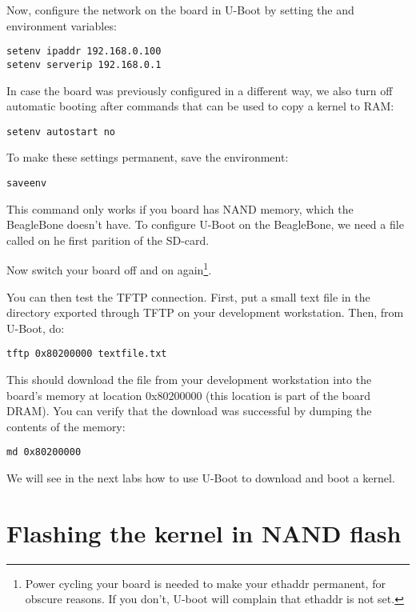 Now, configure the network on the board in U-Boot by setting the 
and  environment variables:

\begin{verbatim}
setenv ipaddr 192.168.0.100
setenv serverip 192.168.0.1
\end{verbatim}

In case the board was previously configured in a different way, we
also turn off automatic booting after commands that can be used to
copy a kernel to RAM:

\begin{verbatim}
setenv autostart no
\end{verbatim}

To make these settings permanent, save the environment:

\begin{verbatim}
saveenv
\end{verbatim}

This command only works if you board has NAND memory, which the BeagleBone doesn't have.
To configure U-Boot on the BeagleBone, we need a file called  on he first parition of the SD-card.

Now switch your board off and on again\footnote{Power cycling your
  board is needed to make your ethaddr permanent, for obscure
  reasons. If you don't, U-boot will complain that ethaddr is not
  set.}.

You can then test the TFTP connection. First, put a small text file in
the directory exported through TFTP on your development
workstation. Then, from U-Boot, do:

\begin{verbatim}
tftp 0x80200000 textfile.txt
\end{verbatim}

This should download the file  from your development
workstation into the board's memory at location 0x80200000 (this
location is part of the board DRAM). You can verify that the download
was successful by dumping the contents of the memory:

\begin{verbatim}
md 0x80200000
\end{verbatim}

We will see in the next labs how to use U-Boot to download and boot a kernel.

\section{Flashing the kernel in NAND flash}

